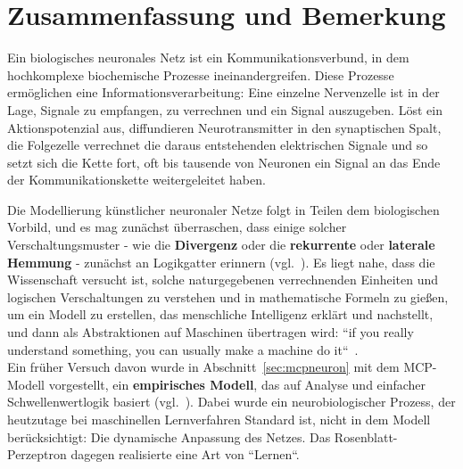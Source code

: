 \chapter{Zusammenfassung und Bemerkung}



Ein biologisches neuronales Netz ist ein Kommunikationsverbund, in dem hochkomplexe biochemische Prozesse ineinandergreifen.
Diese Prozesse ermöglichen eine Informationsverarbeitung: Eine einzelne Nervenzelle ist in der Lage, Signale zu empfangen, zu verrechnen und ein Signal auszugeben.
Löst ein Aktionspotenzial aus, diffundieren Neurotransmitter in den synaptischen Spalt, die Folgezelle verrechnet die daraus entstehenden elektrischen Signale und so setzt sich die Kette fort, oft bis tausende von Neuronen ein Signal an das Ende der Kommunikationskette weitergeleitet haben.

Die Modellierung künstlicher neuronaler Netze folgt in Teilen dem biologischen Vorbild, und es mag zunächst überraschen, dass einige solcher Verschaltungsmuster - wie die \textbf{Divergenz} oder die \textbf{rekurrente} oder \textbf{laterale Hemmung} - zunächst an Logikgatter erinnern (vgl.~\cite[58 f.]{Eil19}). Es liegt nahe, dass die Wissenschaft versucht ist, solche naturgegebenen verrechnenden Einheiten und logischen Verschaltungen zu verstehen und in mathematische Formeln zu gießen, um ein Modell zu erstellen, das menschliche Intelligenz erklärt und nachstellt, und dann als Abstraktionen auf Maschinen übertragen wird: ``if you really understand something, you can usually make a machine do it``~\cite[xiii]{AR88}.\\

Ein früher Versuch davon wurde in Abschnitt~\ref{sec:mcpneuron} mit dem MCP-Modell vorgestellt, ein \textbf{empirisches Modell}, das auf Analyse und einfacher Schwellenwertlogik basiert (vgl.~\cite[16]{AR88}). Dabei wurde ein neurobiologischer Prozess, der heutzutage bei maschinellen Lernverfahren Standard ist, nicht in dem Modell berücksichtigt: Die dynamische Anpassung des Netzes.
Das Rosenblatt-Perzeptron dagegen realisierte eine Art von ``Lernen``.

